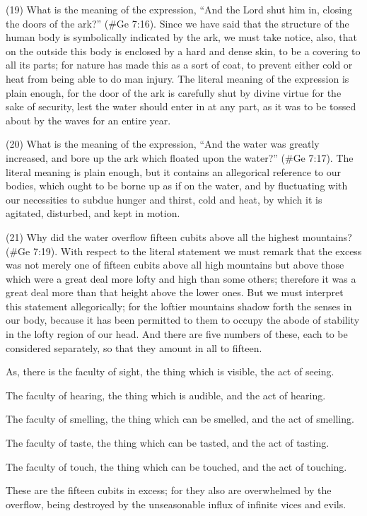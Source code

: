 (19) What is the meaning of the expression, ``And the Lord shut him in, closing the doors of the
ark?'' (\#Ge 7:16). Since we have said that the structure of the human body is symbolically
indicated by the ark, we must take notice, also, that on the outside this body is enclosed by a hard
and dense skin, to be a covering to all its parts; for nature has made this as a sort of coat, to
prevent either cold or heat from being able to do man injury. The literal meaning of the expression
is plain enough, for the door of the ark is carefully shut by divine virtue for the sake of security, lest
the water should enter in at any part, as it was to be tossed about by the waves for an entire year.

(20) What is the meaning of the expression, ``And the water was greatly increased, and bore up the
ark which floated upon the water?'' (\#Ge 7:17). The literal meaning is plain enough, but it
contains an allegorical reference to our bodies, which ought to be borne up as if on the water, and
by fluctuating with our necessities to subdue hunger and thirst, cold and heat, by which it is
agitated, disturbed, and kept in motion.

(21) Why did the water overflow fifteen cubits above all the highest mountains? (\#Ge 7:19).
With respect to the literal statement we must remark that the excess was not merely one of fifteen
cubits above all high mountains but above those which were a great deal more lofty and high than
some others; therefore it was a great deal more than that height above the lower ones. But we
must interpret this statement allegorically; for the loftier mountains shadow forth the senses in our
body, because it has been permitted to them to occupy the abode of stability in the lofty region of
our head. And there are five numbers of these, each to be considered separately, so that they
amount in all to fifteen.

As, there is the faculty of sight, the thing which is visible, the act of seeing.

The faculty of hearing, the thing which is audible, and the act of hearing.

The faculty of smelling, the thing which can be smelled, and the act of smelling.

The faculty of taste, the thing which can be tasted, and the act of tasting.

The faculty of touch, the thing which can be touched, and the act of touching.

These are the fifteen cubits in excess; for they also are overwhelmed by the overflow, being
destroyed by the unseasonable influx of infinite vices and evils.

